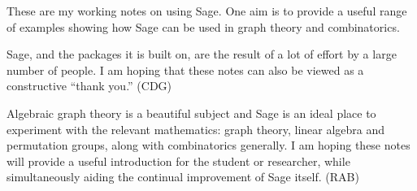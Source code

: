 \begin{preface}
%
\begin{para}
These are my working notes on using Sage. One aim is to provide a useful range of examples showing how Sage can be used in graph theory and combinatorics.
\end{para}
%
\begin{para}
Sage, and the packages it is built on, are the result of a lot of effort by a large number of people. I am hoping that these notes can also be viewed as a constructive ``thank you.''  (CDG)
\end{para}
%
\begin{para}
Algebraic graph theory is a beautiful subject and Sage is an ideal place to experiment with the relevant mathematics: graph theory, linear algebra and permutation groups, along with combinatorics generally.  I am hoping these notes will provide a useful introduction for the student or researcher, while simultaneously aiding the continual improvement of Sage itself.  (RAB)
\end{para}
%
\end{preface}
